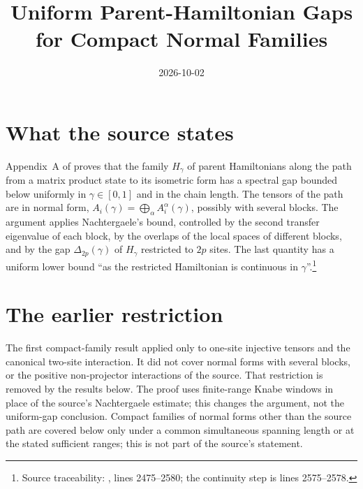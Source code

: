 \documentclass{article}
\title{Uniform Parent-Hamiltonian Gaps for Compact Normal Families}
\author{}
\date{2026-10-02}
\begin{document}
\maketitle
{}

\section{What the source states}
Appendix~A of \cite{Schuch2011Phases} proves that the family $H_\gamma$ of
parent Hamiltonians along the path from a matrix product state to its
isometric form has a spectral gap bounded below uniformly in
$\gamma\in[0,1]$ and in the chain length. The tensors of the path are in
normal form, $A_i(\gamma)=\bigoplus_\alpha A_i^\alpha(\gamma)$, possibly with
several blocks. The argument applies Nachtergaele's bound, controlled by the
second transfer eigenvalue of each block, by the overlaps of the local spaces
of different blocks, and by the gap $\Delta_{2p}(\gamma)$ of $H_\gamma$
restricted to $2p$ sites. The last quantity has a uniform lower bound
``as the restricted Hamiltonian is continuous in $\gamma$''.\footnote{Source
    traceability: , lines 2475--2580; the
    continuity step is lines 2575--2578.}

\section{The earlier restriction}
The first compact-family result applied only to one-site injective tensors
and the canonical two-site interaction. It did not cover normal forms with
several blocks, or the positive non-projector interactions of the source.
That restriction is removed by the results below. The proof uses finite-range
Knabe windows in place of the source's Nachtergaele estimate; this changes
the argument, not the uniform-gap conclusion. Compact families of normal
forms other than the source path are covered below only under a common
simultaneous spanning length or at the stated sufficient ranges; this is
not part of the source's statement.
\end{document}
